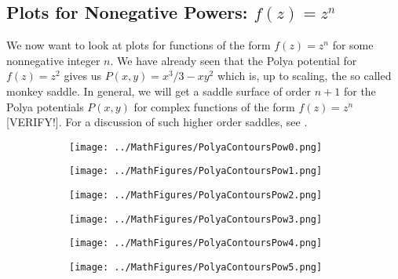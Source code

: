 \documentclass[12pt]{article}
\begin{document}


\subsection{Plots for Nonegative Powers: $f(z) = z^n$}
We now want to look at plots for functions of the form $f(z) = z^n$ for some nonnegative integer $n$. We have already seen that the Polya potential for $f(z) = z^2$ gives us $P(x,y) = x^3/ 3 - x y^2$ which is, up to scaling, the so called monkey saddle. In general, we will get a saddle surface of order $n+1$ for the Polya potentials $P(x,y)$ for complex functions of the form $f(z) = z^n$ [VERIFY!]. For a discussion of such higher order saddles, see \cite{HighOrderSaddles}.

\begin{figure}[h]
\caption{Polya potential contours of $f(z) = z^0$ and $f(z) = z^1$}	
\label{Fig:ContoursPow_0_1}	
\centering
\begin{subfigure}[b]{0.49\textwidth}
\centering
\texttt{[image: ../MathFigures/PolyaContoursPow0.png]}
\end{subfigure}
\begin{subfigure}[b]{0.49\textwidth}
\centering
\texttt{[image: ../MathFigures/PolyaContoursPow1.png]}
\end{subfigure}
\end{figure}

\begin{figure}[h]
\caption{Polya potential contours of $f(z) = z^2$ and $f(z) = z^3$}	
\label{Fig:ContoursPow_2_3}	
\centering
\begin{subfigure}[b]{0.49\textwidth}
\centering
\texttt{[image: ../MathFigures/PolyaContoursPow2.png]}
\end{subfigure}
\begin{subfigure}[b]{0.49\textwidth}
\centering
\texttt{[image: ../MathFigures/PolyaContoursPow3.png]}
\end{subfigure}
\end{figure}

\begin{figure}[h]
\caption{Polya potential contours of $f(z) = z^4$ and $f(z) = z^5$}	
\label{Fig:ContoursPow_4_5}	
\centering
\begin{subfigure}[b]{0.49\textwidth}
\centering
\texttt{[image: ../MathFigures/PolyaContoursPow4.png]}
\end{subfigure}
\begin{subfigure}[b]{0.49\textwidth}
\centering
\texttt{[image: ../MathFigures/PolyaContoursPow5.png]}
\end{subfigure}
\end{figure}
\end{document}
